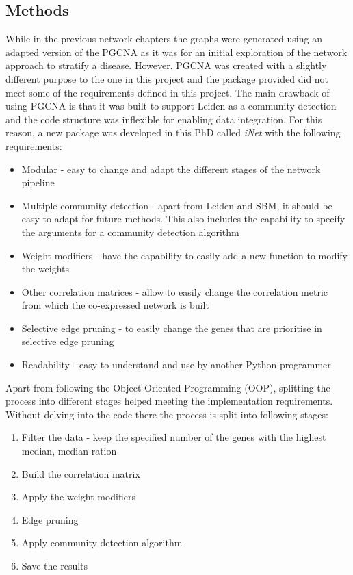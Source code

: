 \subsection{Methods} \label{Sec:N_II:methods}

While in the previous network chapters the graphs were generated using an adapted version of the PGCNA as it was for an initial exploration of the network approach to stratify a disease. However, PGCNA was created with a slightly different purpose to the one in this project and the package provided did not meet some of the requirements defined in this project. The main drawback of using PGCNA is that it was built to support Leiden as a community detection and the code structure was inflexible for enabling data integration. For this reason, a new package was developed in this PhD called \textit{iNet} with the following requirements: 

\begin{itemize}
    \item Modular - easy to change and adapt the different stages of the network pipeline
    \item Multiple community detection - apart from Leiden and SBM, it should be easy to adapt for future methods. This also includes the capability to specify the arguments for a community detection algorithm
    \item Weight modifiers - have the capability to easily add a new function to modify the weights
    \item Other correlation matrices - allow to easily change the correlation metric from which the co-expressed network is built
    \item Selective edge pruning - to easily change the genes that are prioritise in selective edge pruning 
    \item Readability - easy to understand and use by another Python programmer
\end{itemize}

Apart from following the Object Oriented Programming (OOP), splitting the process into different stages helped meeting the implementation requirements. Without delving into the code there the process is split into following stages:
\begin{enumerate}
    \item Filter the data - keep the specified number of the genes with the highest median, median ration
    \item Build the correlation matrix
    \item Apply the weight modifiers
    \item Edge pruning
    \item Apply community detection algorithm
    \item Save the results
\end{enumerate}

